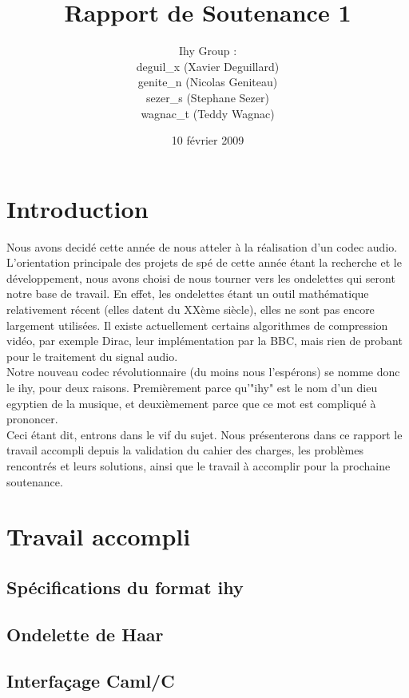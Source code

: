 \documentclass[a4paper,12pt]{article}
\title{Rapport de Soutenance 1}
\author{
Ihy Group : \\
deguil\_x (Xavier Deguillard)\\
genite\_n (Nicolas Geniteau)\\
sezer\_s (Stephane Sezer)\\
wagnac\_t (Teddy Wagnac)
}
\date{10 f\'evrier 2009}
\begin{document}
\maketitle

\newpage

\section*{Introduction}
Nous avons decidé cette année de nous atteler à la réalisation d'un codec audio.
L'orientation principale des projets de spé de cette année étant la recherche et
le développement, nous avons choisi de nous tourner vers les ondelettes qui
seront notre base de travail. En effet, les ondelettes étant un outil
mathématique relativement récent (elles datent du XXème siècle), elles ne sont
pas encore largement utilisées. Il existe actuellement certains algorithmes de
compression vidéo, par exemple Dirac, leur implémentation par la BBC, mais rien
de probant pour le traitement du signal audio.\\
Notre nouveau codec révolutionnaire (du moins nous l'espérons) se nomme donc le
ihy, pour deux raisons. Premièrement parce qu'"ihy" est le nom d'un dieu
egyptien de la musique, et deuxièmement parce que ce mot est compliqué à
prononcer.\\
Ceci étant dit, entrons dans le vif du sujet. Nous présenterons dans ce rapport
le travail accompli depuis la validation du cahier des charges, les problèmes
rencontrés et leurs solutions, ainsi que le travail à accomplir pour la
prochaine soutenance.

\newpage

\tableofcontents

\newpage

\section{Travail accompli}

	\subsection{Spécifications du format ihy}

	\subsection{Ondelette de Haar}

	\subsection{Interfaçage Caml/C}
\end{document}
